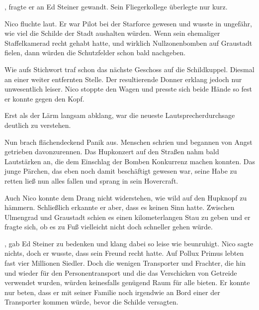 , fragte er an Ed Steiner gewandt. Sein Fliegerkollege überlegte nur kurz. 

\par

Nico fluchte laut. Er war Pilot bei der Starforce gewesen und wusste in ungefähr, wie viel die Schilde der Stadt aushalten würden. Wenn sein ehemaliger Staffelkamerad recht gehabt hatte, und wirklich Nullzonenbomben auf Graustadt fielen, dann würden die Schutzfelder schon bald nachgeben.

\par

Wie aufs Stichwort traf schon das nächste Geschoss auf die Schildkuppel. Diesmal an einer weiter entfernten Stelle. Der resultierende Donner erklang jedoch nur unwesentlich leiser. Nico stoppte den Wagen und presste sich beide Hände so fest er konnte gegen den Kopf.

\par

Erst als der Lärm langsam abklang, war die neueste Lautsprecherdurchsage deutlich zu verstehen. 

\par

Nun brach flächendeckend Panik aus. Menschen schrien und begannen von Angst getrieben davonzurennen. Das Hupkonzert auf den Straßen nahm bald Lautstärken an, die dem Einschlag der Bomben Konkurrenz machen konnten. Das junge Pärchen, das eben noch damit beschäftigt gewesen war, seine Habe zu retten ließ nun alles fallen und sprang in sein Hovercraft.

\par

Auch Nico konnte dem Drang nicht widerstehen, wie wild auf den Hupknopf zu hämmern. Schließlich erkannte er aber, dass es keinen Sinn hatte. Zwischen Ulmengrad und Graustadt schien es einen kilometerlangen Stau zu geben und er fragte sich, ob es zu Fuß vielleicht nicht doch schneller gehen würde.

\par

, gab Ed Steiner zu bedenken und klang dabei so leise wie beunruhigt. Nico sagte nichts, doch er wusste, dass sein Freund recht hatte. Auf Pollux Primus lebten fast vier Millionen Siedler. Doch die wenigen Transporter und Frachter, die hin und wieder für den Personentransport und die das Verschicken von Getreide verwendet wurden, würden keinesfalls genügend Raum für alle bieten. Er konnte nur beten, dass er mit seiner Familie noch irgendwie an Bord einer der Transporter kommen würde, bevor die Schilde versagten.

